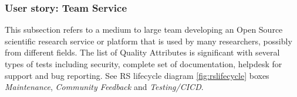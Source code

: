 \subsubsection{User story: Team Service}

This subsection refers to a medium to large team developing an Open Source scientific research service or platform that is used by many researchers, possibly from different fields. The list of Quality Attributes is significant with several types of tests including security, complete set of documentation, helpdesk for support and bug reporting. See RS lifecycle diagram \ref{fig:rslifecycle} boxes \textit{Maintenance}, \textit{Community Feedback} and \textit{Testing/CICD}.

\begin{table}[h]
  \centering
  \scriptsize
  \begin{tabular}{|p{0.55\linewidth}|p{0.3\linewidth}|} \hline


\end{tabular}
\end{table}
